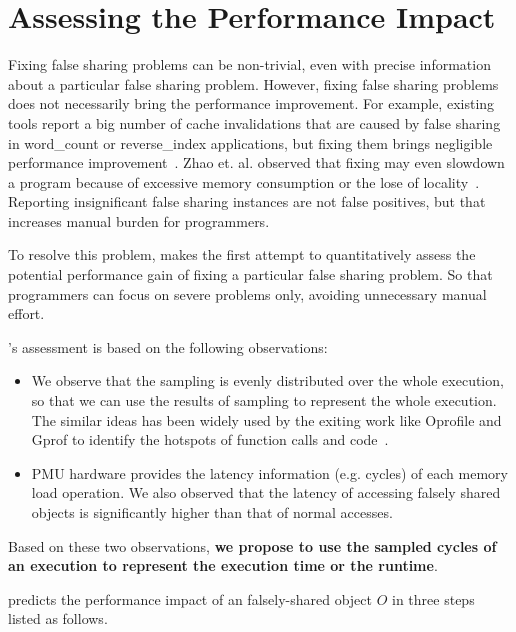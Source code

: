\section{Assessing the Performance Impact}

\label{sec:predictimprove}

Fixing false sharing problems can be non-trivial, even with precise information about a particular false sharing problem. However, fixing false sharing problems does not necessarily bring the performance improvement. For example, existing tools report a big number of cache invalidations that are caused by false sharing in word\_count or reverse\_index applications, but fixing them brings negligible performance improvement~\cite{Sheriff, Predator}. Zhao et. al. observed that fixing may even slowdown a program because of excessive memory consumption or the lose of locality~\cite{qinzhao}. Reporting insignificant false sharing instances are not false positives, but that increases manual burden for programmers.

To resolve this problem, \cheetah{} makes the first attempt to quantitatively assess the potential performance gain of fixing a particular false sharing problem. So that programmers can focus on severe problems only, avoiding unnecessary manual effort.

\cheetah{}'s assessment is based on the following observations:

\begin{itemize}
\item We observe that the sampling is evenly distributed over the whole execution, so that we can  use the results of sampling to represent the whole execution. The similar ideas has been widely used by the exiting work like Oprofile and Gprof to identify the hotspots of function calls and code~\cite{oprofile, DBLP:conf/sigplan/GrahamKM82}.

\item PMU hardware provides the latency information (e.g. cycles) of each memory load operation. We also observed that the latency of accessing falsely shared objects is significantly higher than that of normal accesses. 

\end{itemize}

Based on these two observations, {\bf we propose to use the sampled cycles of an execution to represent the execution time or the runtime}. 

\cheetah{} predicts the performance impact of an falsely-shared object $O$ in three steps listed as follows. 

